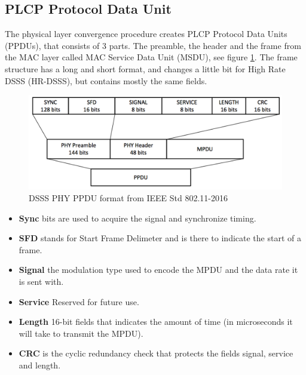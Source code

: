 	\subsection{PLCP Protocol Data Unit}
	The physical layer convergence procedure creates PLCP Protocol Data Units (PPDUs), 
	that consists of 3 parts. The preamble, the header and the frame from the MAC layer
	called MAC Service Data Unit (MSDU), see figure \ref{fig:PPDU}. The frame structure
	has a long and short format, and changes a little bit for High Rate DSSS (HR-DSSS),
	but contains mostly the same fields.

	\begin{figure}
	\center
	\includegraphics[scale=0.5]{Images/PPDU.png}
	\caption{DSSS PHY PPDU format from IEEE Std 802.11-2016  }
	\label{fig:PPDU}
	\end{figure}


	\begin{itemize}
	\item \textbf{Sync} bits are used to acquire the signal and synchronize timing. 
	\item \textbf{SFD} stands for Start Frame Delimeter and is there to indicate the start of a frame.  
	\item \textbf{Signal} the modulation type used to encode the MPDU and
	the data rate it is sent with. 
	\item \textbf{Service} Reserved for future use. 
	\item \textbf{Length} 16-bit fields that indicates the amount of time (in
			microseconds it will take to transmit the MPDU).
	\item \textbf{CRC} is the cyclic redundancy check that protects
	the fields signal, service and length. 
	\end{itemize}

